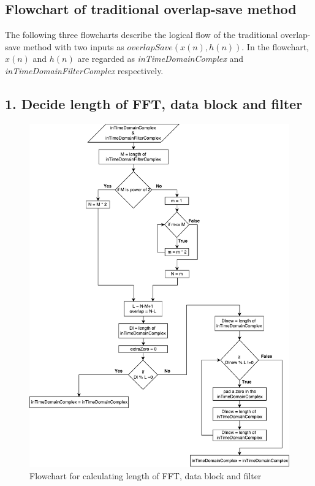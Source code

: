 \subsection*{Flowchart of traditional overlap-save method}
The following three flowcharts describe the logical flow of the traditional overlap-save method with two inputs as $overlapSave(x(n), h(n))$. In the flowchart, $x(n)$ and $h(n)$ are regarded as \textit{inTimeDomainComplex} and  \textit{inTimeDomainFilterComplex} respectively.
\subsection*{1. Decide length of FFT, data block and filter}
\begin{figure}[h]
	\centering
	\includegraphics[width=13cm]{./algorithms/overlap_save/figures/overlapSave.pdf}
	\caption{Flowchart for calculating length of FFT, data block and filter}
	\label{overlapSave_length}
\end{figure}

